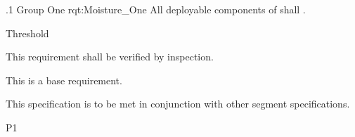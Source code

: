\ONERQMTVKSA
{\RqtNumberBase.1}
{Group One}
{rqt:Moisture_One}
{All deployable components of \ThisSys shall \TBD.}
{
	\item [Phase 1] Threshold
}
{This requirement shall be verified by inspection.}
{
\item [N/A] This is a base requirement.
}
{
	\item This specification is to be met in conjunction with other segment specifications.
}
{P1}

